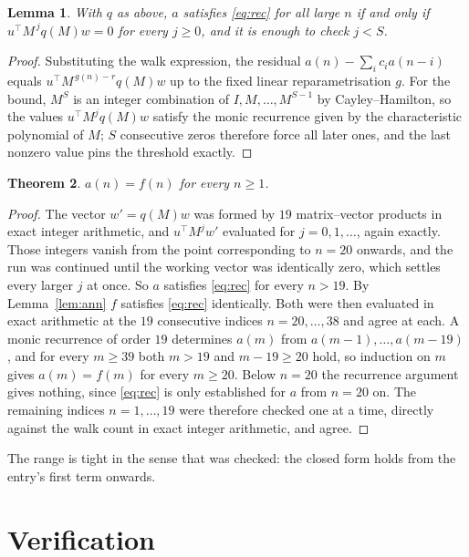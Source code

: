 \documentclass[11pt,a4paper]{article}
\theoremstyle{plain}
\newtheorem{theorem}{Theorem}
\newtheorem{lemma}[theorem]{Lemma}
\theoremstyle{definition}
\begin{document}
\begin{lemma}\label{lem:crit}
With $q$ as above, $a$ satisfies \eqref{eq:rec} for all large $n$ if and only if
$u^{\!\top}M^{\,j}q(M)w=0$ for every $j\ge0$, and it is enough to check $j<S$.
\end{lemma}

\begin{proof}
Substituting the walk expression, the residual $a(n)-\sum_ic_ia(n-i)$ equals
$u^{\!\top}M^{\,g(n)-r}q(M)w$ up to the fixed linear reparametrisation $g$. For the bound,
$M^{S}$ is an integer combination of $I,M,\dots,M^{S-1}$ by Cayley--Hamilton, so the values
$u^{\!\top}M^{j}q(M)w$ satisfy the monic recurrence given by the characteristic polynomial of
$M$; $S$ consecutive zeros therefore force all later ones, and the last nonzero value pins the
threshold exactly.
\end{proof}

\begin{theorem}
$a(n)=f(n)$ for every $n\ge1$.
\end{theorem}

\begin{proof}
The vector $w'=q(M)w$ was formed by $19$ matrix--vector products in exact integer
arithmetic, and $u^{\!\top}M^{j}w'$ evaluated for $j=0,1,\dots$, again exactly. Those integers
vanish from the point corresponding to $n=20$ onwards, and the run was continued until the
working vector was identically zero, which settles every larger $j$ at once. So $a$ satisfies
\eqref{eq:rec} for every $n>19$. By Lemma~\ref{lem:ann} $f$ satisfies \eqref{eq:rec}
identically. Both were then evaluated in exact arithmetic at the $19$ consecutive indices
$n=20,\dots,38$ and agree at each. A monic recurrence of order $19$
determines $a(m)$ from $a(m-1),\dots,a(m-19)$, and for every $m\ge39$ both
$m>19$ and $m-19\ge20$ hold, so induction on $m$ gives $a(m)=f(m)$ for every
$m\ge20$.
Below $n=20$ the recurrence argument gives nothing, since \eqref{eq:rec} is only
established for $a$ from $n=20$ on. The remaining indices $n=1,\dots,19$ were
therefore checked one at a time, directly against the walk count in exact integer arithmetic,
and agree.
\end{proof}

The range is tight in the sense that was checked: the closed form holds from the entry's first term onwards.

\section{Verification}
\end{document}

